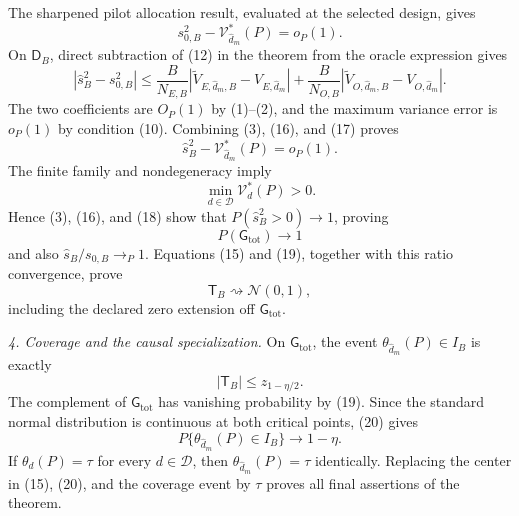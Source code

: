 The sharpened pilot allocation result, evaluated at the selected design, gives
\[
 s_{0,B}^2-\mathcal V_{\widehat d_m}^*(P)=o_P(1).
 \tag{16}
\]
On \(\mathsf D_B\), direct subtraction of (12) in the theorem from the oracle expression gives
\[
 |\widehat s_B^2-s_{0,B}^2|
 \le \frac{B}{N_{E,B}}
 |\widetilde V_{E,\widehat d_m,B}-V_{E,\widehat d_m}|
 +\frac{B}{N_{O,B}}
 |\widetilde V_{O,\widehat d_m,B}-V_{O,\widehat d_m}|.
 \tag{17}
\]
The two coefficients are \(O_P(1)\) by (1)--(2), and the maximum variance error is \(o_P(1)\) by condition (10).  Combining (3), (16), and (17) proves
\[
 \widehat s_B^2-\mathcal V_{\widehat d_m}^*(P)=o_P(1).
 \tag{18}
\]
The finite family and nondegeneracy imply
\[
 \min_{d\in\mathcal D}\mathcal V_d^*(P)>0.
\]
Hence (3), (16), and (18) show that \(P(\widehat s_B^2>0)\to1\), proving
\[
 P(\mathsf G_{\mathrm{tot}})\longrightarrow1
 \tag{19}
\]
and also \(\widehat s_B/s_{0,B}\to_P1\).  Equations (15) and (19), together with this ratio convergence, prove
\[
 \mathsf T_B\rightsquigarrow\mathcal N(0,1),
 \tag{20}
\]
including the declared zero extension off \(\mathsf G_{\mathrm{tot}}\).

\emph{4. Coverage and the causal specialization.}
On \(\mathsf G_{\mathrm{tot}}\), the event \(\theta_{\widehat d_m}(P)\in I_B\) is exactly
\[
 |\mathsf T_B|\le z_{1-\eta/2}.
\]
The complement of \(\mathsf G_{\mathrm{tot}}\) has vanishing probability by (19).  Since the standard normal distribution is continuous at both critical points, (20) gives
\[
 P\{\theta_{\widehat d_m}(P)\in I_B\}\longrightarrow1-\eta.
\]
If \(\theta_d(P)=\tau\) for every \(d\in\mathcal D\), then \(\theta_{\widehat d_m}(P)=\tau\) identically.  Replacing the center in (15), (20), and the coverage event by \(\tau\) proves all final assertions of the theorem.